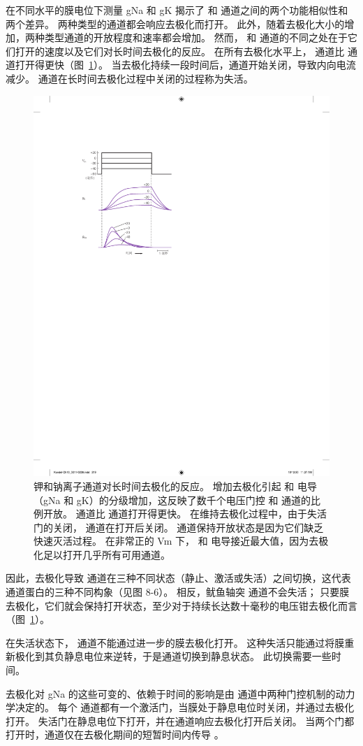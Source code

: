 在不同水平的膜电位下测量 gNa 和 gK 揭示了  和  通道之间的两个功能相似性和两个差异。
两种类型的通道都会响应去极化而打开。
此外，随着去极化大小的增加，两种类型通道的开放程度和速率都会增加。
然而， 和  通道的不同之处在于它们打开的速度以及它们对长时间去极化的反应。
在所有去极化水平上， 通道比  通道打开得更快（图~\ref{fig:10_6}）。 
当去极化持续一段时间后，通道开始关闭，导致内向电流减少。
 通道在长时间去极化过程中关闭的过程称为失活。


\begin{figure}[htbp]
	\centering
	\includegraphics[width=0.5\linewidth]{chap10/fig_10_6}
	\caption{钾和钠离子通道对长时间去极化的反应。 增加去极化引起  和  电导（gNa 和 gK）的分级增加，这反映了数千个电压门控  和  通道的比例开放。  通道比  通道打开得更快。 在维持去极化过程中，由于失活门的关闭， 通道在打开后关闭。  通道保持开放状态是因为它们缺乏快速灭活过程。 在非常正的 Vm 下， 和  电导接近最大值，因为去极化足以打开几乎所有可用通道。}
	\label{fig:10_6}
\end{figure}


因此，去极化导致  通道在三种不同状态（静止、激活或失活）之间切换，这代表  通道蛋白的三种不同构象（见图 8-6）。
相反，鱿鱼轴突  通道不会失活；
只要膜去极化，它们就会保持打开状态，至少对于持续长达数十毫秒的电压钳去极化而言（图~\ref{fig:10_6}）。


在失活状态下， 通道不能通过进一步的膜去极化打开。
这种失活只能通过将膜重新极化到其负静息电位来逆转，于是通道切换到静息状态。
此切换需要一些时间。


去极化对 gNa 的这些可变的、依赖于时间的影响是由  通道中两种门控机制的动力学决定的。
每个  通道都有一个激活门，当膜处于静息电位时关闭，并通过去极化打开。
失活门在静息电位下打开，并在通道响应去极化打开后关闭。
当两个门都打开时，通道仅在去极化期间的短暂时间内传导 。



